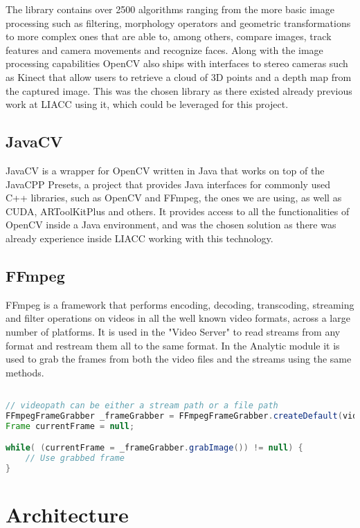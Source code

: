 The library contains over 2500 algorithms ranging from the more basic image processing such as filtering, morphology operators and geometric transformations to more complex ones that are able to, among others, compare images, track features and camera movements and recognize faces. Along with the image processing capabilities OpenCV also ships with interfaces to stereo cameras such as Kinect that allow users to retrieve a cloud of 3D points and a depth map from the captured image. This was the chosen library as there existed already previous work at LIACC using it, which could be leveraged for this project.

\subsection{JavaCV}
JavaCV is a wrapper for OpenCV written in Java that works on top of the JavaCPP Presets, a project that provides Java interfaces for commonly used C++ libraries, such as OpenCV and FFmpeg, the ones we are using, as well as CUDA, ARToolKitPlus and others. It provides access to all the functionalities of OpenCV inside a Java environment, and was the chosen solution as there was already experience inside LIACC working with this technology.

\subsection{FFmpeg}
FFmpeg is a framework that performs encoding, decoding, transcoding, streaming and filter operations on videos in all the well known video formats, across a large number of platforms. It is used in the "Video Server" to read streams from any format and restream them all to the same format. In the Analytic module it is used to grab the frames from both the video files and the streams using the same methods.

\begin{lstlisting}[float,language=Java, label=src:ffmpegframegrabber, caption=FFmpegFrameGrabber usage example] 

// videopath can be either a stream path or a file path
FFmpegFrameGrabber _frameGrabber = FFmpegFrameGrabber.createDefault(videopath);
Frame currentFrame = null;

while( (currentFrame = _frameGrabber.grabImage()) != null) {
	// Use grabbed frame
}

\end{lstlisting}

\section{Architecture}

